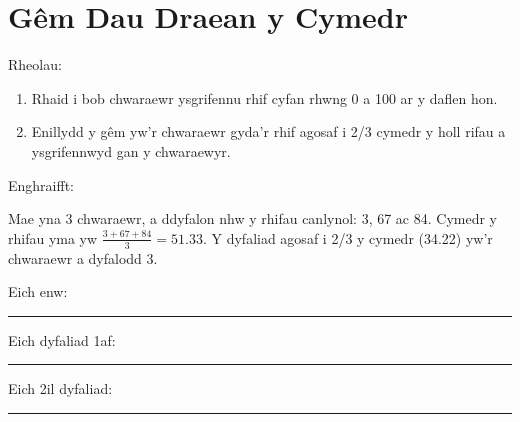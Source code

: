 \documentclass{article}
\begin{document}
\section*{G\^{e}m Dau Draean y Cymedr}

Rheolau:

\begin{enumerate}
  \item Rhaid i bob chwaraewr ysgrifennu rhif cyfan rhwng 0 a 100 ar y daflen
  hon.
  \item Enillydd y g\^{e}m yw'r chwaraewr gyda'r rhif agosaf i 2/3 cymedr y
  holl rifau a ysgrifennwyd gan y chwaraewyr.
\end{enumerate}

\vspace{10mm}

Enghraifft:

Mae yna 3 chwaraewr, a ddyfalon nhw y rhifau canlynol: 3, 67 ac 84.
Cymedr y rhifau yma yw $\frac{3 + 67 + 84}{3} = 51.33$.
Y dyfaliad agosaf i 2/3 y cymedr (34.22) yw'r chwaraewr a dyfalodd 3.

\vspace{20mm}

Eich enw:

\vspace{3mm}

\hrule

\vspace{10mm}

Eich dyfaliad 1af:

\vspace{3mm}

\hrule

\vspace{10mm}

Eich 2il dyfaliad:

\vspace{3mm}

\hrule
\end{document}
